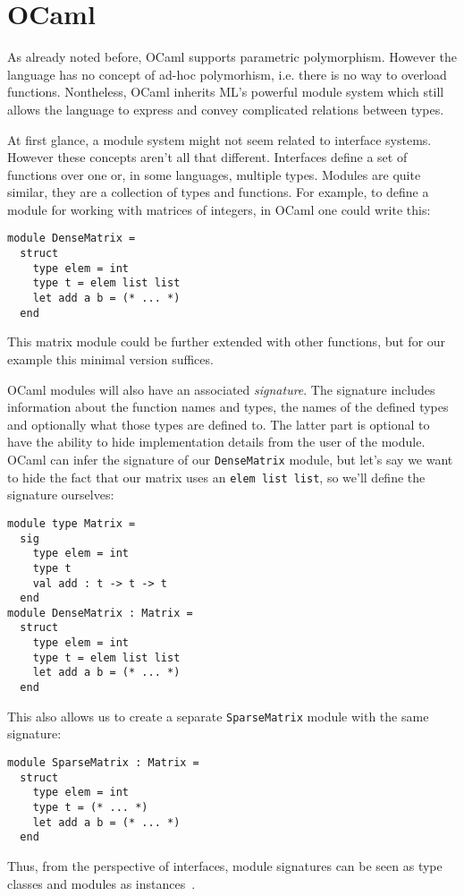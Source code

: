 \section{OCaml}

As already noted before, OCaml supports parametric polymorphism. However the language has no concept of ad-hoc polymorhism, i.e. there is no way to overload functions. Nontheless, OCaml inherits ML's powerful module system which still allows the language to express and convey complicated relations between types.

At first glance, a module system might not seem related to interface systems. However these concepts aren't all that different. Interfaces define a set of functions over one or, in some languages, multiple types. Modules are quite similar, they are a collection of types and functions. For example, to define a module for working with matrices of integers, in OCaml one could write this:
\begin{verbatim}
module DenseMatrix =
  struct
    type elem = int
    type t = elem list list
    let add a b = (* ... *)
  end
\end{verbatim}
This matrix module could be further extended with other functions, but for our example this minimal version suffices.

OCaml modules will also have an associated \textit{signature}. The signature includes information about the function names and types, the names of the defined types and optionally what those types are defined to. The latter part is optional to have the ability to hide implementation details from the user of the module. OCaml can infer the signature of our \verb|DenseMatrix| module, but let's say we want to hide the fact that our matrix uses an \verb|elem list list|, so we'll define the signature ourselves:
\begin{verbatim}
module type Matrix =
  sig
    type elem = int
    type t
    val add : t -> t -> t
  end
module DenseMatrix : Matrix =
  struct
    type elem = int
    type t = elem list list
    let add a b = (* ... *)
  end
\end{verbatim}
This also allows us to create a separate \verb|SparseMatrix| module with the same signature:
\begin{verbatim}
module SparseMatrix : Matrix =
  struct
    type elem = int
    type t = (* ... *)
    let add a b = (* ... *)
  end
\end{verbatim}
Thus, from the perspective of interfaces, module signatures can be seen as type classes and modules as instances~\cite{modular-type-classes}.

